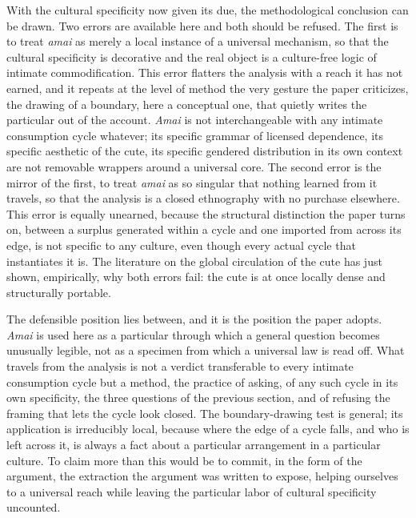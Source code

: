 With the cultural specificity now given its due, the methodological conclusion can be drawn. Two errors are available here and both should be refused. The first is to treat \textit{amai} as merely a local instance of a universal mechanism, so that the cultural specificity is decorative and the real object is a culture-free logic of intimate commodification. This error flatters the analysis with a reach it has not earned, and it repeats at the level of method the very gesture the paper criticizes, the drawing of a boundary, here a conceptual one, that quietly writes the particular out of the account. \textit{Amai} is not interchangeable with any intimate consumption cycle whatever; its specific grammar of licensed dependence, its specific aesthetic of the cute, its specific gendered distribution in its own context are not removable wrappers around a universal core. The second error is the mirror of the first, to treat \textit{amai} as so singular that nothing learned from it travels, so that the analysis is a closed ethnography with no purchase elsewhere. This error is equally unearned, because the structural distinction the paper turns on, between a surplus generated within a cycle and one imported from across its edge, is not specific to any culture, even though every actual cycle that instantiates it is. The literature on the global circulation of the cute has just shown, empirically, why both errors fail: the cute is at once locally dense and structurally portable.

The defensible position lies between, and it is the position the paper adopts. \textit{Amai} is used here as a particular through which a general question becomes unusually legible, not as a specimen from which a universal law is read off. What travels from the analysis is not a verdict transferable to every intimate consumption cycle but a method, the practice of asking, of any such cycle in its own specificity, the three questions of the previous section, and of refusing the framing that lets the cycle look closed. The boundary-drawing test is general; its application is irreducibly local, because where the edge of a cycle falls, and who is left across it, is always a fact about a particular arrangement in a particular culture. To claim more than this would be to commit, in the form of the argument, the extraction the argument was written to expose, helping ourselves to a universal reach while leaving the particular labor of cultural specificity uncounted.

